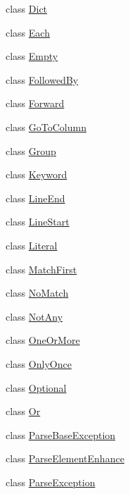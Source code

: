 \begin{DoxyCompactItemize}
\item 
class \hyperlink{classpip_1_1__vendor_1_1pyparsing_1_1Dict}{Dict}
\item 
class \hyperlink{classpip_1_1__vendor_1_1pyparsing_1_1Each}{Each}
\item 
class \hyperlink{classpip_1_1__vendor_1_1pyparsing_1_1Empty}{Empty}
\item 
class \hyperlink{classpip_1_1__vendor_1_1pyparsing_1_1FollowedBy}{Followed\+By}
\item 
class \hyperlink{classpip_1_1__vendor_1_1pyparsing_1_1Forward}{Forward}
\item 
class \hyperlink{classpip_1_1__vendor_1_1pyparsing_1_1GoToColumn}{Go\+To\+Column}
\item 
class \hyperlink{classpip_1_1__vendor_1_1pyparsing_1_1Group}{Group}
\item 
class \hyperlink{classpip_1_1__vendor_1_1pyparsing_1_1Keyword}{Keyword}
\item 
class \hyperlink{classpip_1_1__vendor_1_1pyparsing_1_1LineEnd}{Line\+End}
\item 
class \hyperlink{classpip_1_1__vendor_1_1pyparsing_1_1LineStart}{Line\+Start}
\item 
class \hyperlink{classpip_1_1__vendor_1_1pyparsing_1_1Literal}{Literal}
\item 
class \hyperlink{classpip_1_1__vendor_1_1pyparsing_1_1MatchFirst}{Match\+First}
\item 
class \hyperlink{classpip_1_1__vendor_1_1pyparsing_1_1NoMatch}{No\+Match}
\item 
class \hyperlink{classpip_1_1__vendor_1_1pyparsing_1_1NotAny}{Not\+Any}
\item 
class \hyperlink{classpip_1_1__vendor_1_1pyparsing_1_1OneOrMore}{One\+Or\+More}
\item 
class \hyperlink{classpip_1_1__vendor_1_1pyparsing_1_1OnlyOnce}{Only\+Once}
\item 
class \hyperlink{classpip_1_1__vendor_1_1pyparsing_1_1Optional}{Optional}
\item 
class \hyperlink{classpip_1_1__vendor_1_1pyparsing_1_1Or}{Or}
\item 
class \hyperlink{classpip_1_1__vendor_1_1pyparsing_1_1ParseBaseException}{Parse\+Base\+Exception}
\item 
class \hyperlink{classpip_1_1__vendor_1_1pyparsing_1_1ParseElementEnhance}{Parse\+Element\+Enhance}
\item 
class \hyperlink{classpip_1_1__vendor_1_1pyparsing_1_1ParseException}{Parse\+Exception}
\item 

\end{DoxyCompactItemize}
